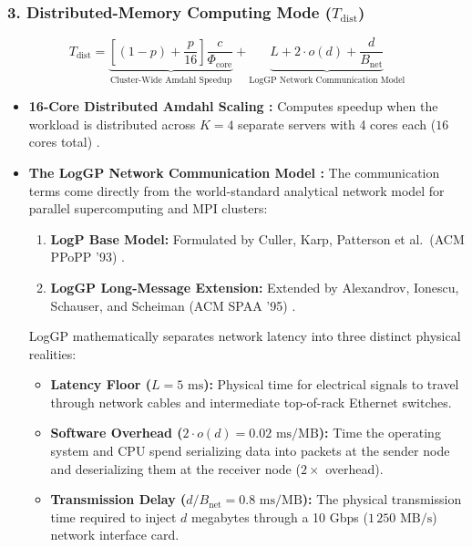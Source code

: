 \documentclass[11pt,a4paper]{article}
\begin{document}
\subsubsection*{3. Distributed-Memory Computing Mode ($T_{\text{dist}}$)}
\begin{equation}
    T_{\text{dist}} = \underbrace{\left[(1-p) + \frac{p}{16}\right] \frac{c}{\Phi_{\text{core}}}}_{\text{Cluster-Wide Amdahl Speedup}} + \underbrace{L + 2 \cdot o(d) + \frac{d}{B_{\text{net}}}}_{\text{LogGP Network Communication Model}}
\end{equation}
\begin{itemize}[noitemsep, topsep=1pt]
    \item \textbf{16-Core Distributed Amdahl Scaling \cite{amdahl1967validity}:} Computes speedup when the workload is distributed across $K=4$ separate servers with 4 cores each ($16$ cores total) \cite{amdahl1967validity}.
    \item \textbf{The LogGP Network Communication Model \cite{alexandrov1995loggp, culler1993logp}:} The communication terms come directly from the world-standard analytical network model for parallel supercomputing and MPI clusters:
    \begin{enumerate}[noitemsep, topsep=1pt]
        \item \textbf{LogP Base Model:} Formulated by Culler, Karp, Patterson et al.\ (ACM PPoPP '93) \cite{culler1993logp}.
        \item \textbf{LogGP Long-Message Extension:} Extended by Alexandrov, Ionescu, Schauser, and Scheiman (ACM SPAA '95) \cite{alexandrov1995loggp}.
    \end{enumerate}
    LogGP mathematically separates network latency into three distinct physical realities:
    \begin{itemize}[noitemsep, topsep=1pt]
        \item \textbf{Latency Floor ($L = 5\text{ ms}$):} Physical time for electrical signals to travel through network cables and intermediate top-of-rack Ethernet switches.
        \item \textbf{Software Overhead ($2 \cdot o(d) = 0.02\text{ ms/MB}$):} Time the operating system and CPU spend serializing data into packets at the sender node and deserializing them at the receiver node ($2 \times$ overhead).
        \item \textbf{Transmission Delay ($d / B_{\text{net}} = 0.8\text{ ms/MB}$):} The physical transmission time required to inject $d$ megabytes through a 10 Gbps ($1\,250\text{ MB/s}$) network interface card.
    \end{itemize}
\end{itemize}
\end{document}
